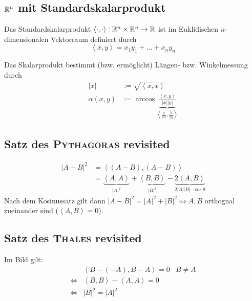 
\subsection*{$\mathbb R^n$ mit Standardskalarprodukt} %

Das Standardskalarprodukt $\left\langle \cdot, \cdot \right\rangle: \mathbb R^n \times \mathbb R^n \to \mathbb R$ ist im
Euklidischen $n$-dimensionalen Vektorraum definiert durch
$$
	\left\langle x,y \right\rangle = x_1 y_1 + \dots + x_n y_n
$$

\begin{bem}
	Das Skalarprodukt bestimmt (bzw. ermöglicht) Längen- bzw. Winkelmessung durch
	\begin{align*}
		| x | & := \sqrt{\left\langle x,x \right\rangle}\\
		\alpha (x,y) & := \arccos \underbrace{\frac{\left\langle x,y \right\rangle}{| x | | y
		|}}_{\left\langle \frac{x}{| x |}, \frac{y}{|y|} \right\rangle}
	\end{align*}
\end{bem}


\subsection*{Satz des \textsc{Pythagoras} revisited} %
\label{sub:Satz des Pythagoras revisited}

\begin{align*}
	| A - B |^2 & = \left\langle (A-B), (A-B) \right\rangle\\
	& = \underbrace{\left\langle A,A \right\rangle}_{|A|^2} + \underbrace{\left\langle B,B
	\right\rangle}_{|B|^2} - \underbrace{2 \left\langle A,B \right\rangle}_{2 |A| |B| \cdot \cos
	\theta}
\end{align*}
Nach dem Kosinussatz gilt dann $|A - B|^2 = |A|^2 + |B|^2 \Leftrightarrow A,B$ orthognal zueinander
sind ($\left\langle A,B \right\rangle = 0$).


\subsection*{Satz des \textsc{Thales} revisited} %
\label{sub:Satz des Thales revisited}

Im Bild gilt:
\begin{align*}
	& \left\langle B-(-A), B-A \right\rangle = 0 & B \neq A\\
	\Leftrightarrow & \left\langle B,B \right\rangle - \left\langle A,A \right\rangle = 0\\
	\Leftrightarrow & |B|^2 = |A|^2
\end{align*}

